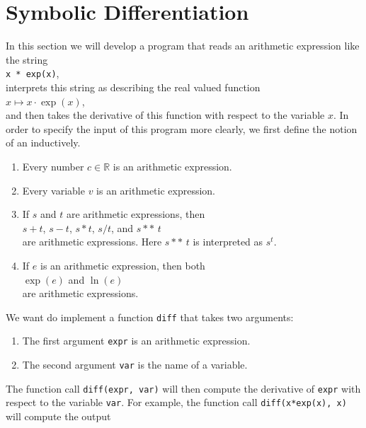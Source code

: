 \section{Symbolic Differentiation}
In this section we will develop a program that reads an arithmetic expression like the string
\\[0.2cm]
\hspace*{1.3cm}
\texttt{x * exp(x)},
\\[0.2cm]
interprets this string as describing the real valued function 
\\[0.2cm]
\hspace*{1.3cm}
$x \mapsto x \cdot \exp(x)$, 
\\[0.2cm]
and then takes the derivative of this function with respect to the variable $x$.  In order to specify the input
of this program more clearly, we first define the notion of an  inductively.
\begin{enumerate}
\item Every number $c \in \mathbb{R}$ is an arithmetic expression.
\item Every variable $v$ is an arithmetic expression.
\item If $s$ and $t$ are arithmetic expressions, then
      \\[0.2cm]
      \hspace*{1.3cm}
      $s + t$, \quad $s - t$, \quad $s * t$, \quad $s / t$, \quad and \quad $s \,\mathtt{**}\, t$
      \\[0.2cm]
      are arithmetic expressions.  Here $s \,\mathtt{**}\, t$ is interpreted as $s^t$.
      
\item If $e$ is an arithmetic expression, then both
      \\[0.2cm]
      \hspace*{1.3cm}
      $\exp(e)$ \quad and \quad $\ln(e)$
      \\[0.2cm]
      are arithmetic expressions.
\end{enumerate}
We want do implement a function \texttt{diff} that takes two arguments:
\begin{enumerate}
\item The first argument \texttt{expr} is an arithmetic expression.
\item The second argument \texttt{var} is the name of a variable.
\end{enumerate}
The function call \texttt{diff(expr, var)} will then compute the derivative of \texttt{expr} with respect to the variable \texttt{var}.  For example, the function call \texttt{diff(x*exp(x), x)} will compute the output
